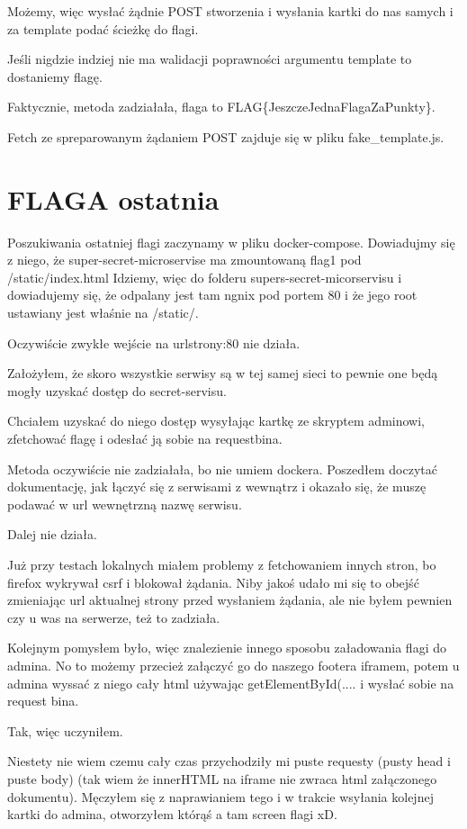 \documentclass{article}
\begin{document}
Możemy, więc wysłać żądnie POST stworzenia i wysłania kartki do nas samych i za template podać ścieżkę do flagi. 

Jeśli nigdzie indziej nie ma walidacji poprawności argumentu template to dostaniemy flagę.

Faktycznie, metoda zadziałała, flaga to FLAG\{JeszczeJednaFlagaZaPunkty\}.

Fetch ze spreparowanym żądaniem POST zajduje się w pliku fake\_template.js.

\section*{FLAGA ostatnia}

Poszukiwania ostatniej flagi zaczynamy w pliku docker-compose. Dowiadujmy się z niego, że super-secret-microservise ma zmountowaną flag1 pod /static/index.html
Idziemy, więc do folderu supers-secret-micorservisu i dowiadujemy się, że odpalany jest tam ngnix pod portem 80 i że jego root ustawiany jest właśnie na /static/.

Oczywiście zwykłe wejście na urlstrony:80 nie działa.

Założyłem, że skoro wszystkie serwisy są w tej samej sieci to pewnie one będą mogły uzyskać dostęp do secret-servisu.

Chciałem uzyskać do niego dostęp wysyłając kartkę ze skryptem adminowi, zfetchować flagę i odesłać ją sobie na requestbina.

Metoda oczywiście nie zadziałała, bo nie umiem dockera. Poszedłem doczytać dokumentację, jak łączyć się z serwisami z wewnątrz i okazało się, że muszę podawać w url wewnętrzną nazwę serwisu.

Dalej nie działa. 

Już przy testach lokalnych miałem problemy z fetchowaniem innych stron, bo firefox wykrywał csrf i blokował żądania. Niby jakoś udało mi się to obejść zmieniając url aktualnej strony przed wysłaniem żądania,
ale nie byłem pewnien czy u was na serwerze, też to zadziała.

Kolejnym pomysłem było, więc znalezienie innego sposobu załadowania flagi do admina. 
No to możemy przecież załączyć go do naszego footera iframem, potem u admina wyssać z niego cały html używając getElementById(....
i wysłać sobie na request bina.

Tak, więc uczyniłem. 

Niestety nie wiem czemu cały czas przychodziły mi puste requesty (pusty head i puste body) (tak wiem że innerHTML na iframe nie zwraca html załączonego dokumentu).
Męczyłem się z naprawianiem tego i w trakcie wsyłania kolejnej kartki do admina, otworzyłem którąś a tam screen flagi xD.
\end{document}
